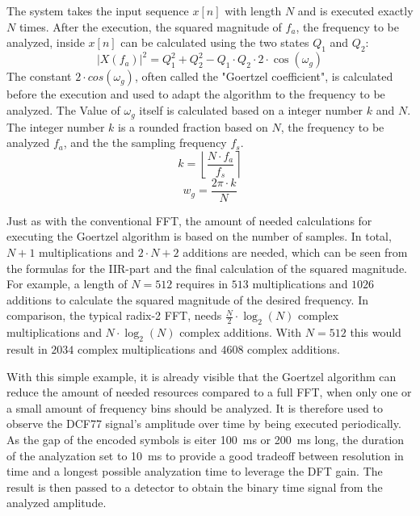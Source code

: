 \documentclass[conference]{IEEEtran}
\begin{document}
\FloatBarrier\noindent
The system takes the input sequence $x[n]$ with length $N$ and is executed exactly $N$ times.
After the execution, the squared magnitude of $f_{a}$, the frequency to be analyzed, inside $x[n]$ can be calculated using the two states $Q_{1}$ and $Q_{2}$:
\begin{equation}
    |X(f_{a})|^2 = Q_{1}^2 + Q_{2}^2 - Q_{1} \cdot Q_{2} \cdot 2 \cdot \cos(\omega_{g})
\end{equation}
The constant $2 \cdot cos(\omega_{g})$, often called the "Goertzel coefficient", is calculated before the execution and used to adapt the algorithm to the frequency to be analyzed.
The Value of $\omega_{g}$ itself is calculated based on a integer number $k$ and $N$.
The integer number $k$ is a rounded fraction based on $N$, the frequency to be analyzed $f_{a}$, and the the sampling frequency $f_{s}$.
\begin{equation}
    k = \left\lfloor \frac{N \cdot f_{a}}{f_{s}} \right\rceil
\end{equation}
\begin{equation}
    w_g = \frac{2\pi \cdot k}{N}
\end{equation}

\par
Just as with the conventional FFT, the amount of needed calculations for executing the Goertzel algorithm is based on the number of samples.
In total, $N + 1$ multiplications and $2 \cdot N + 2$ additions are needed, which can be seen from the formulas for the IIR-part and the final calculation of the squared magnitude.
For example, a length of $N = 512$ requires in $513$ multiplications and $1026$ additions to calculate the squared magnitude of the desired frequency.
In comparison, the typical radix-2 FFT, needs $\frac{N}{2} \cdot \log_{2}(N)$ complex multiplications and $N \cdot \log_{2}(N)$ complex additions. With $N = 512$ this would result in $2034$ complex multiplications and $4608$ complex additions.
\par
With this simple example, it is already visible that the Goertzel algorithm can reduce the amount of needed resources compared to a full FFT, when only one or a small amount of frequency bins should be analyzed.
It is therefore used to observe the DCF77 signal's amplitude over time by being executed periodically.
As the gap of the encoded symbols is eiter \SI{100}{\milli\second} or \SI{200}{\milli\second} long, the duration of the analyzation set to \SI{10}{\milli\second} to provide a good tradeoff between resolution in time and a longest possible analyzation time
to leverage the DFT gain.
The result is then passed to a detector to obtain the binary time signal from the analyzed
amplitude.
\end{document}
